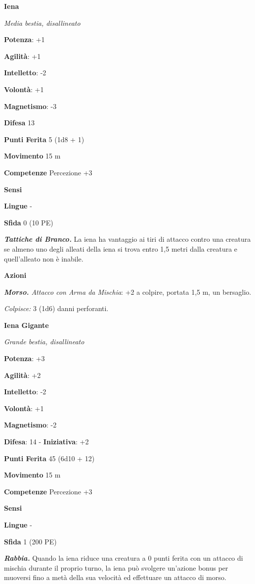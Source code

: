 \begin{multicols}{2}
\textbf{Iena}

\emph{Media bestia, disallineato}

\textbf{Potenza}: +1

\textbf{Agilità}: +1

\textbf{Intelletto}: -2

\textbf{Volontà}: +1

\textbf{Magnetismo}: -3

\textbf{Difesa} 13

\textbf{Punti Ferita} 5 (1d8 + 1)

\textbf{Movimento} 15 m

\textbf{Competenze} Percezione +3

\textbf{Sensi} 

\textbf{Lingue} -

\textbf{Sfida} 0 (10 PE)

\emph{\textbf{Tattiche di Branco.}} La iena ha vantaggio ai tiri di
attacco contro una creatura se almeno uno degli alleati della iena si
trova entro 1,5 metri dalla creatura e quell'alleato non è inabile.

\textbf{Azioni}

\emph{\textbf{Morso.} Attacco con Arma da Mischia}: +2 a colpire,
portata 1,5 m, un bersaglio.

\emph{Colpisce:} 3 (1d6) danni perforanti.

\textbf{Iena Gigante}

\emph{Grande bestia, disallineato}

\textbf{Potenza}: +3

\textbf{Agilità}: +2

\textbf{Intelletto}: -2

\textbf{Volontà}: +1

\textbf{Magnetismo}: -2

\textbf{Difesa}: 14 - \textbf{Iniziativa}: +2

\textbf{Punti Ferita} 45 (6d10 + 12)

\textbf{Movimento} 15 m

\textbf{Competenze} Percezione +3

\textbf{Sensi} 

\textbf{Lingue} -

\textbf{Sfida} 1 (200 PE)

\emph{\textbf{Rabbia.}} Quando la iena riduce una creatura a 0 punti
ferita con un attacco di mischia durante il proprio turno, la iena può
svolgere un'azione bonus per muoversi fino a metà della sua velocità ed
effettuare un attacco di morso.


\end{multicols}
